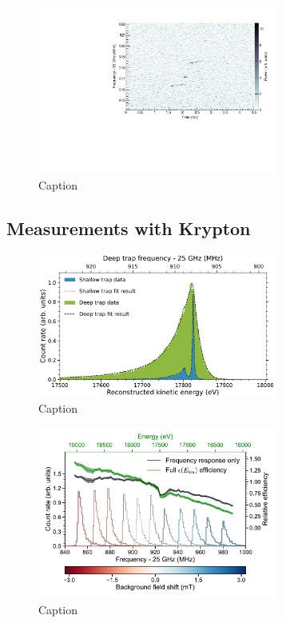 \begin{figure}[htbp]
    \centering
    \includegraphics[width=0.7\textwidth]{figs/Chapter-3/T2_Event0.pdf}
    \caption{Caption}
    \label{fig:tritium_event0}
\end{figure}

\subsection{Measurements with Krypton}

\begin{figure}[htbp]
    \centering
    \includegraphics[width=0.7\textwidth]{figs/Chapter-3/kr_fit.pdf}
    \caption{Caption}
    \label{fig:krypton_fit}
\end{figure}

\begin{figure}[htbp]
    \centering
    \includegraphics[width=0.7\textwidth]{figs/Chapter-3/fss_for_prl_plot.pdf}
    \caption{Caption}
    \label{fig:fss_plot}
\end{figure}

